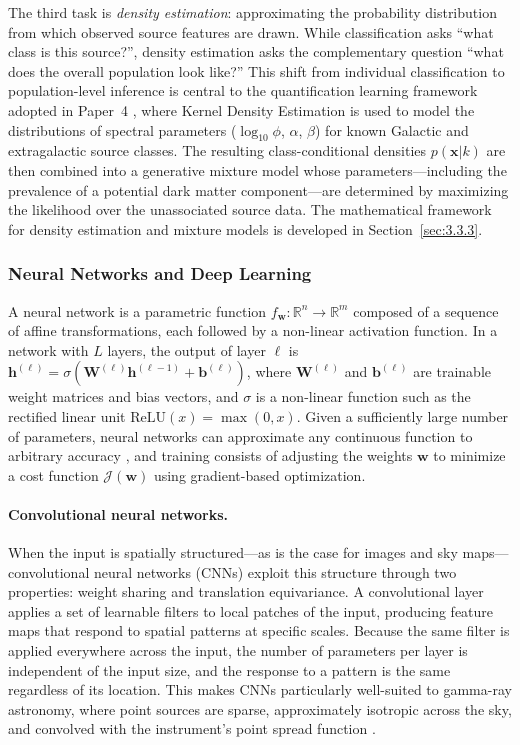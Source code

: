 The third task is \textit{density estimation}: approximating the probability distribution from which observed source features are drawn. While classification asks ``what class is this source?'', density estimation asks the complementary question ``what does the overall population look like?'' This shift from individual classification to population-level inference is central to the quantification learning framework adopted in Paper~4 \cite{Amerio:2025sub}, where Kernel Density Estimation is used to model the distributions of spectral parameters ($\log_{10}\phi$, $\alpha$, $\beta$) for known Galactic and extragalactic source classes. The resulting class-conditional densities $p(\mathbf{x}|k)$ are then combined into a generative mixture model whose parameters---including the prevalence of a potential dark matter component---are determined by maximizing the likelihood over the unassociated source data. The mathematical framework for density estimation and mixture models is developed in Section~\ref{sec:3.3.3}.


\subsubsection{Neural Networks and Deep Learning}
\label{sec:3.3.2}

A neural network is a parametric function $f_{\boldsymbol{w}}: \mathbb{R}^n \to \mathbb{R}^m$ composed of a sequence of affine transformations, each followed by a non-linear activation function. In a network with $L$ layers, the output of layer $\ell$ is $\mathbf{h}^{(\ell)} = \sigma(\mathbf{W}^{(\ell)}\mathbf{h}^{(\ell-1)} + \mathbf{b}^{(\ell)})$, where $\mathbf{W}^{(\ell)}$ and $\mathbf{b}^{(\ell)}$ are trainable weight matrices and bias vectors, and $\sigma$ is a non-linear function such as the rectified linear unit $\mathrm{ReLU}(x) = \max(0, x)$. Given a sufficiently large number of parameters, neural networks can approximate any continuous function to arbitrary accuracy \cite{Bishop:2006}, and training consists of adjusting the weights $\boldsymbol{w}$ to minimize a cost function $\mathcal{J}(\boldsymbol{w})$ using gradient-based optimization.

\paragraph{Convolutional neural networks.}

When the input is spatially structured---as is the case for images and sky maps---convolutional neural networks (CNNs) exploit this structure through two properties: weight sharing and translation equivariance. A convolutional layer applies a set of learnable filters to local patches of the input, producing feature maps that respond to spatial patterns at specific scales. Because the same filter is applied everywhere across the input, the number of parameters per layer is independent of the input size, and the response to a pattern is the same regardless of its location. This makes CNNs particularly well-suited to gamma-ray astronomy, where point sources are sparse, approximately isotropic across the sky, and convolved with the instrument's point spread function \cite{Amerio:2023dns}.


